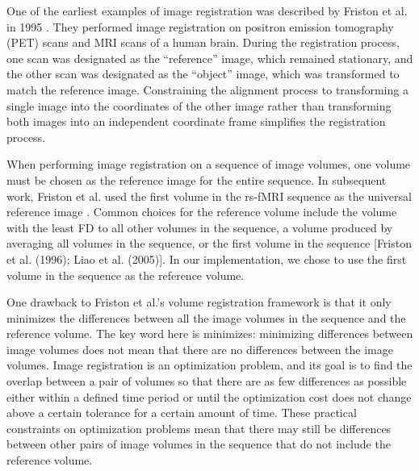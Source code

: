 One of the earliest examples of image registration was described by Friston et al. in 1995 \cite{Friston1995}. They performed image registration on positron emission tomography (PET) scans and MRI scans of a human brain. During the registration process, one scan was designated as the ``reference'' image, which remained stationary, and the other scan was designated as the ``object'' image, which was transformed to match the reference image. Constraining the alignment process to transforming a single image into the coordinates of the other image rather than transforming both images into an independent coordinate frame simplifies the registration process.

When performing image registration on a sequence of image volumes, one volume must be chosen as the reference image for the entire sequence. In subsequent work, Friston et al. used the first volume in the rs-fMRI sequence as the universal reference image \cite{Friston1996}. Common choices for the reference volume include the volume with the least FD to all other volumes in the sequence, a volume produced by averaging all volumes in the sequence, or the first volume in the sequence [Friston et al. (1996); Liao et al. (2005)]. In our implementation, we chose to use the first volume in the sequence as the reference volume.

One drawback to Friston et al.'s volume registration framework is that it only minimizes the differences between all the image volumes in the sequence and the reference volume. The key word here is minimizes: minimizing differences between image volumes does not mean that there are no differences between the image volumes. Image registration is an optimization problem, and its goal is to find the overlap between a pair of volumes so that there are as few differences as possible either within a defined time period or until the optimization cost does not change above a certain tolerance for a certain amount of time. These practical constraints on optimization problems mean that there may still be differences between other pairs of image volumes in the sequence that do not include the reference volume. 


